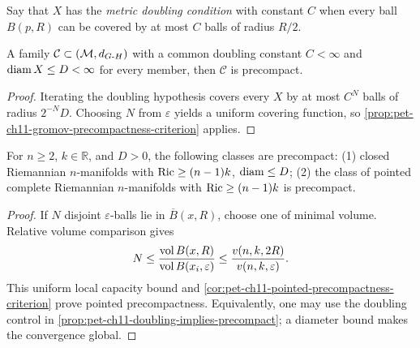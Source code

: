 \begin{definition}
  \label{def:pet-ch11-metric-doubling-condition}
  Say that $X$ has the \emph{metric doubling condition} with constant $C$ when
  every ball $B(p,R)$ can be covered by at most $C$ balls of radius $R/2$.
\end{definition}

\begin{proposition}
  \label{prop:pet-ch11-doubling-implies-precompact}
  A family $\mathcal{C}\subset(\mathcal{M},d_{G\text{-}H})$ with a common doubling
  constant $C<\infty$ and $\operatorname{diam} X\le D<\infty$ for every member, then
  $\mathcal{C}$ is precompact.
\end{proposition}
\begin{proof}
  \sketch
  Iterating the doubling hypothesis covers every \(X\) by at most \(C^N\)
  balls of radius \(2^{-N}D\). Choosing \(N\) from \(\varepsilon\) yields a
  uniform covering function, so
  \cref{prop:pet-ch11-gromov-precompactness-criterion} applies.
\end{proof}


\begin{corollary}
  \label{cor:pet-ch11-ricci-diam-precompactness}
  For $n\ge2$, $k\in\mathbb{R}$, and $D>0$, the following classes are
  precompact: (1) closed Riemannian
  $n$-manifolds with $\operatorname{Ric}\ge(n-1)k$, $\operatorname{diam}\le D$; (2) the
  class of pointed complete Riemannian $n$-manifolds with $\operatorname{Ric}\ge(n-1)k$ is
  precompact.
\end{corollary}
\begin{proof}
  \sketch
  If \(N\) disjoint \(\varepsilon\)-balls lie in \(\overline B(x,R)\), choose one of minimal volume. Relative volume comparison gives
  \[
    N\le \frac{\operatorname{vol} B(x,R)}{\operatorname{vol} B(x_i,\varepsilon)}
      \le \frac{v(n,k,2R)}{v(n,k,\varepsilon)}.
  \]
  This uniform local capacity bound and
  \cref{cor:pet-ch11-pointed-precompactness-criterion} prove pointed
  precompactness. Equivalently, one may use the doubling control in
  \cref{prop:pet-ch11-doubling-implies-precompact}; a diameter bound makes the
  convergence global.
\end{proof}


